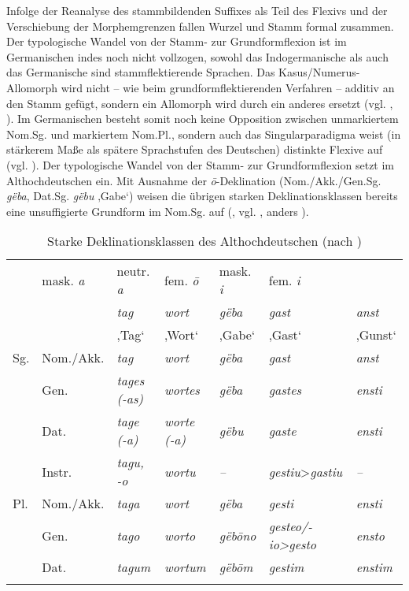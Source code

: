 Infolge der Reanalyse des stammbildenden Suffixes als Teil des Flexivs und der Verschiebung der Morphemgrenzen fallen Wurzel und Stamm formal zusammen. Der typologische Wandel von der Stamm- zur Grundformflexion ist im Germanischen indes noch nicht vollzogen, sowohl das Indogermanische als auch das Germanische sind stammflektierende Sprachen. Das Kasus/Numerus-Allomorph wird nicht -- wie beim grundformflektierenden Verfahren -- additiv an den Stamm gefügt, sondern ein Allomorph wird durch ein anderes ersetzt (vgl. \citealt[295]{Nübling2008}, \citealt[106]{Werner1969}). Im Germanischen besteht somit noch keine Opposition zwischen unmarkiertem Nom.Sg. und markiertem Nom.Pl., sondern auch das Singularparadigma weist (in stärkerem Maße als spätere Sprachstufen des Deutschen) distinkte Flexive auf (vgl. \citealt[76]{Kürschner2008a}). Der typologische Wandel von der Stamm- zur Grundformflexion setzt im Althochdeutschen ein. Mit Ausnahme der \textit{ō}{}-Deklination (Nom./Akk./Gen.Sg. \textit{gëba}, Dat.Sg. \textit{gëbu} ‚Gabe‘) weisen die übrigen starken Deklinationsklassen bereits eine unsuffigierte Grundform im Nom.Sg. auf (, vgl. \citealt[81]{Kürschner2008a}, anders \citealt{Harnisch1994b, Harnisch2001}).

\begin{table}
\small
\begin{tabularx}{\textwidth}{lllllll}
\lsptoprule

\multicolumn{2}{l}{germ. DK} & {mask. \textit{a}} & {neutr. \textit{a}} & {fem. \textit{ō}} & {mask. \textit{i}} & {fem. \textit{i}}\\
\multicolumn{2}{c}{} & \textit{tag}  & \textit{wort}  & \textit{gëba}  & \textit{gast}  & \textit{anst} \\
& & ‚Tag‘ & ‚Wort‘ &  ‚Gabe‘ &  ‚Gast‘ &  ‚Gunst‘\\
\midrule
{Sg.} & Nom./Akk. & \textit{tag} & \textit{wort} & \textit{gëba} & \textit{gast} & \textit{anst}\\
& Gen. & \textit{tages (-as)} & \textit{wortes} & \textit{gëba} & \textit{gastes} & \textit{ensti}\\
& Dat. & \textit{tage (-a)} & \textit{worte (-a)} & \textit{gëbu} & \textit{gaste} & \textit{ensti}\\
& Instr. & \textit{tagu, -o} & \textit{wortu} & \textit{{}--} & \textit{gestiu}>\textit{gastiu} & \textit{{}--}\\
\tablevspace
{Pl.} & Nom./Akk. & \textit{taga} & \textit{wort} & \textit{gëba} & \textit{gesti} & \textit{ensti}\\
& Gen. & \textit{tago} & \textit{worto} & \textit{gëbōno} & \textit{gesteo/-io>gesto} & \textit{ensto}\\
& Dat. & \textit{tagum} & \textit{wortum} & \textit{gëbōm} & \textit{gestim} & \textit{enstim}\\
\lspbottomrule
\end{tabularx}
\caption{Starke Deklinationsklassen des Althochdeutschen (nach \citealt{BrauneHeidermanns2018})}
\label{tab:6}
\end{table}

